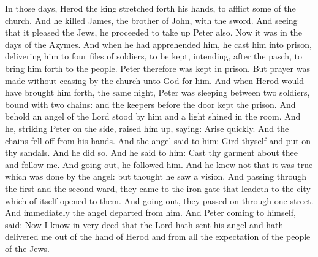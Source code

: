 




In those days, Herod the king stretched forth his hands, to
afflict some of the church.
And he killed James, the brother of John, with the sword.
And seeing that it pleased the Jews, he proceeded to take up Peter
also. Now it was in the days of the Azymes.
And when he had apprehended him, he cast him into prison,
delivering him to four files of soldiers, to be kept, intending, after
the pasch, to bring him forth to the people.
Peter therefore was kept in prison. But prayer was made without
ceasing by the church unto God for him.
And when Herod would have brought him forth, the same night, Peter
was sleeping between two soldiers, bound with two chains: and the
keepers before the door kept the prison.
And behold an angel of the Lord stood by him and a light shined in
the room. And he, striking Peter on the side, raised him up, saying:
Arise quickly. And the chains fell off from his hands.
And the angel said to him: Gird thyself and put on thy sandals.
And he did so. And he said to him: Cast thy garment about thee and
follow me.
And going out, he followed him. And he knew not that it was true
which was done by the angel: but thought he saw a vision.
And passing through the first and the second ward, they came to
the iron gate that leadeth to the city which of itself opened to them.
And going out, they passed on through one street. And immediately the
angel departed from him.
And Peter coming to himself, said: Now I know in very deed that
the Lord hath sent his angel and hath delivered me out of the hand of
Herod and from all the expectation of the people of the Jews.




